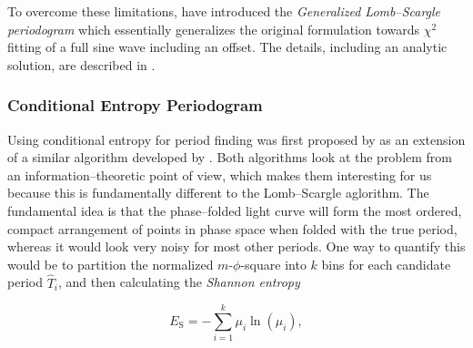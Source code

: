 To overcome these limitations, \citeauthor{zechmeister2009} have introduced the \emph{Generalized Lomb--Scargle periodogram} which essentially generalizes the original formulation towards $\chi^2$ fitting of a full sine wave including an offset. The details, including an analytic solution, are described in \citet{zechmeister2009}.



\subsubsection{Conditional Entropy Periodogram}
\label{subsubsec:conditional-entropy}

Using conditional entropy for period finding was first proposed by \citet{graham2013} as an extension of a similar algorithm developed by \citet{cincotta1995}. Both algorithms look at the problem from an information--theoretic point of view, which makes them interesting for us because this is fundamentally different to the Lomb--Scargle aglorithm. The fundamental idea is that the phase--folded light curve will form the most ordered, compact arrangement of points in phase space when folded with the true period, whereas it would look very noisy for most other periods. One way to quantify this would be to partition the normalized $m$-$\phi$-square into $k$ bins for each candidate period $\hat T_i$, and then calculating the \emph{Shannon entropy}

\begin{equation}
\label{eq:shannon-entropy}
E_\text{S} = - \sum_{i=1}^k \mu_i \ln(\mu_i),
\end{equation}

